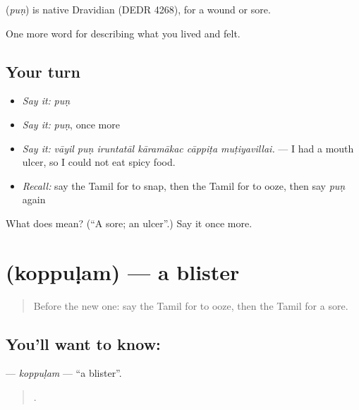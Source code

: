 \begin{cousinweb}
\textbf{} (\emph{puṇ}) is native Dravidian (DEDR 4268), for a wound or sore.
\end{cousinweb}

\begin{grammarlens}[title={What you've built}]
One more word for describing what you lived and felt.
\end{grammarlens}

\subsection*{Your turn}
\begin{itemize}
\raggedright
  \item \emph{Say it:} \emph{puṇ}
  \item \emph{Say it:} \emph{puṇ}, once more
  \item \emph{Say it:} \emph{vāyil puṇ iruntatāl kāramākac cāppiṭa muṭiyavillai.} — I had a mouth ulcer, so I could not eat spicy food.
  \item \emph{Recall:} say the Tamil for to snap, then the Tamil for to ooze, then say \emph{puṇ} again
\end{itemize}

\begin{tcolorbox}[breakable,colback=teal!4,colframe=teal!35!black,title={Before you move on}]
What does  mean? (\textquotedblleft{}A sore; an ulcer\textquotedblright{}.) Say it once more.
\end{tcolorbox}
\section[\texorpdfstring{\ta{கொப்புளம்} (koppuḷam)}{கொப்புளம் (koppuḷam)}]{ (koppuḷam) — a blister}

\label{lesson:TA-C483-koppulam}



\begin{quote}
Before the new one: say the Tamil for to ooze, then the Tamil for a sore.
\end{quote}

\subsection*{You'll want to know: }
\textbf{} — \emph{koppuḷam} — \textquotedblleft{}a blister\textquotedblright{}.

\begin{quote}
     .
\end{quote}

